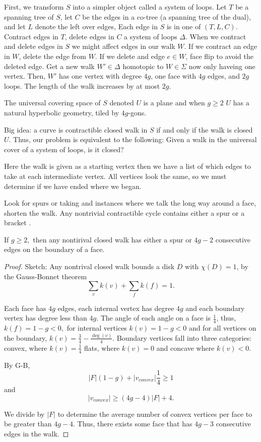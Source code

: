 First, we transform $S$ into a simpler object called a system of loops.  
Let $T$ be a spanning tree of $S$, let $C$ be the edges in a co-tree
(a spanning tree of the dual), and let $L$ denote the left over edges,
Each edge in $S$ is in one of $(T,L,C)$.
Contract edges in $T$, delete edges in $C$ a system of loops $\Delta$.
When we contract and delete edges in $S$ we might affect edges in our walk $W$.
If we contract an edge in $W$, delete the edge from $W$.
If we delete and edge $e\in W$, face flip to avoid the deleted edge.
Get a new walk $W' \in \Delta$ homotopic to $W\in \Sigma$
now only haveing one vertex. Then, $W'$ has one vertex
with degree $4g$, one face with $4g$ edges, and $2g$ loops.
The length of the walk increases by at most $2g$.


The universal covering space of $S$ denoted $U$ is a plane
and when $g\geq 2$ $U$ has a natural hyperbolic geometry,
tiled by $4g$-gons.


Big idea: a curve is contractible closed walk in $S$
if and only if the walk is closed $U$.
Thus, our problem is equivalent to the following: Given a walk
in the universal cover of a system of loops, is it closed?

Here the walk is given as a starting vertex then we have a list of which
edges to take at each intermediate vertex. 
All vertices look the same, so we must determine if we have ended where
we began. 

Look for spurs or taking and instances where we talk the long way around a face, 
shorten the walk.
Any nontrivial contractible cycle contains either a spur or a bracket \cite{gertsen-short-1990}.
\begin{lemma}\label{lem:dehn}
If $g\geq 2,$ then any nontirival closed walk has either a spur
or $4g-2$ consecutive edges on the boundary of a face.
\end{lemma}
\begin{proof}
Sketch: 
Any nontrival closed walk bounds a disk $D$ with $\chi(D)=1$, by the Gauss-Bonnet theorem
$$\sum_v k(v)+\sum_f k(f) =1.$$

Each face has $4g$ edges, each internal vertex has degree $4g$
and each  boundary vertex  has degree less than $4g$.
The angle of each angle on a face  is $\frac{1}{4}$,
thus, $k(f)=1-g<0,$ for internal vertices  $k(v)=1-g<0$ and for all
vertices on the boundary, $k(v)=\frac{3}{4}-\frac{\deg(v)}{4}$.
Boundary vertices fall into three  categories: convex, where $k(v)=\frac{1}{4}$
flats,  where $k(v)=0$  and concave where $k(v)<0$.

By G-B, $$|F|(1-g)+|v_{convex}|\frac{1}{4}\geq 1$$
and 
$$|v_{convex}|\geq (4g-4)|F|+4.$$

We divide by $|F|$ to determine the average number
of convex vertices per face to be greater than $4g-4$.
Thus, there exists some face that has $4g-3$ consecutive edges in the walk.
\end{proof}

